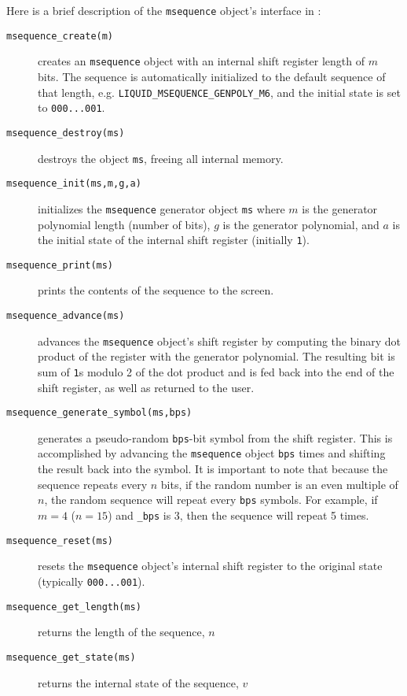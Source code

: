 Here is a brief description of the {\tt msequence} object's interface in
\liquid:
\begin{description}
\item[{\tt msequence\_create(m)}]
    creates an {\tt msequence} object with an internal shift register length
    of $m$ bits.
    The sequence is automatically initialized to the default sequence of that
    length, e.g. {\tt LIQUID\_MSEQUENCE\_GENPOLY\_M6}, and the initial state is set
    to {\tt 000...001}.
\item[{\tt msequence\_destroy(ms)}]
    destroys the object {\tt ms}, freeing all internal memory.
\item[{\tt msequence\_init(ms,m,g,a)}]
    initializes the {\tt msequence} generator object {\tt ms} where
    $m$ is the generator polynomial length (number of bits),
    $g$ is the generator polynomial, and
    $a$ is the initial state of the internal shift register (initially
    {\tt  1}).
\item[{\tt msequence\_print(ms)}]
    prints the contents of the sequence to the screen.
\item[{\tt msequence\_advance(ms)}]
    advances the {\tt msequence} object's shift register by computing the
    binary dot product of the register with the generator polynomial.
    The resulting bit is sum of {\tt 1}s modulo 2 of the dot product and is
    fed back into the end of the shift register, as well as returned to the
    user.
\item[{\tt msequence\_generate\_symbol(ms,bps)}]
    generates a pseudo-random {\tt bps}-bit symbol from the shift register.
    This is accomplished by advancing the {\tt msequence} object {\tt bps}
    times and shifting the result back into the symbol.
    It is important to note that because the sequence repeats every $n$ bits,
    if the random number is an even multiple of $n$, the random sequence will
    repeat every {\tt bps} symbols.
    For example, if $m=4$ ($n=15$) and {\tt \_bps} is 3, then the sequence
    will repeat 5 times.
\item[{\tt msequence\_reset(ms)}]
    resets the {\tt msequence} object's internal shift register to the
    original state (typically {\tt 000...001}).
\item[{\tt msequence\_get\_length(ms)}]
    returns the length of the sequence, $n$
\item[{\tt msequence\_get\_state(ms)}]
    returns the internal state of the sequence, $v$
\end{description}

